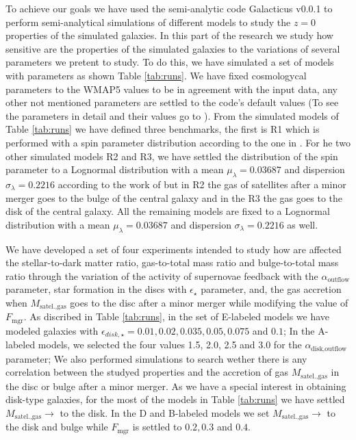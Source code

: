 \documentclass[usenatbib]{mn2e}
\begin{document}
To achieve our goals we have used the semi-analytic code Galacticus v0.0.1 to perform semi-analytical simulations of different models to study the $z=0$  
properties of the simulated galaxies.  In this part of the research we study  how sensitive are the properties of the 
simulated  galaxies  to the variations of several parameters we pretent to study. To do this, we have simulated a set of models with parameters as shown Table 
\ref{tab:runs}. We have fixed cosmologycal parameters to the WMAP5 values to be in agreement with the input data, any other not mentioned parameters are settled to the
 code's default values (To see the parameters in detail and their values go to \cite{2010arXiv1008.1786B}). From the  simulated models of Table \ref{tab:runs}
 we have defined three benchmarks,  the first is R1 which is performed with a spin parameter distribution according to the one in \cite{2007MNRAS.376..215B}.
 For he two other simulated models R2 and R3,  we have settled the distribution of the spin parameter to a Lognormal distribution  with a mean 
 $\mu_{\lambda}=0.03687$ and dispersion $\sigma_{\lambda}=0.2216$ according to the work of \cite{2011MNRAS.411..584M} but in  R2 the gas of satellites after 
a minor merger goes to the bulge of the central galaxy and in the R3 the gas goes to the disk of the central galaxy. All the remaining models are fixed to a
 Lognormal distribution with a mean $\mu_{\lambda}=0.03687$ and dispersion $\sigma_{\lambda}=0.2216$ as well.
 
We have developed a set of four experiments intended to study how are affected the stellar-to-dark matter ratio, gas-to-total mass ratio and bulge-to-total mass ratio through the variation 
of the activity of supernovae feedback with the  $\alpha_{\text{outflow}}$ parameter,  star formation in the discs with  $\epsilon_\star$ parameter, and, the gas accretion 
 when $M_{\text{satel.,gas}}$ goes to the disc after a minor merger while modifying the value of  $F_{\text{mgr}}$.
As discribed in Table \ref{tab:runs}, in the set of E-labeled models  we have modeled galaxies  with 
$\epsilon_{disk,\star}=0.01, 0.02, 0.035, 0.05,0.075$ and $0.1$; In the A-labeled models, we selected the four values 1.5, 2.0, 2.5 and 3.0 for the 
$\alpha_{\text{disk,outflow}}$ parameter; We also performed simulations to search wether there is any correlation between the studyed properties and the 
accretion of gas $M_{\text{satel.,gas}}$ in the disc or bulge after a minor merger. As we have a special interest in obtaining disk-type galaxies, for the most of the models 
in Table \ref{tab:runs} we have settled $M_{\text{satel.,gas}}\to$ to the disk. In the D and B-labeled models we set $M_{\text{satel.,gas}}\to$ to the disk and bulge 
while $F_{\text{mgr}}$ is settled to $0.2,0.3$ and $0.4$.
  
\end{document}

